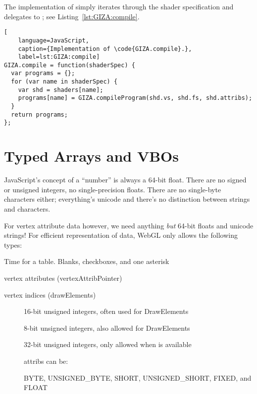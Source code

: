 The implementation of  simply iterates through the shader specification and delegates to ; see Listing~\ref{lst:GIZA:compile}.

\begin{lstlisting}[
    language=JavaScript,
    caption={Implementation of \code{GIZA.compile}.},
    label=lst:GIZA:compile]
GIZA.compile = function(shaderSpec) {
  var programs = {};
  for (var name in shaderSpec) {
    var shd = shaders[name];
    programs[name] = GIZA.compileProgram(shd.vs, shd.fs, shd.attribs);
  }
  return programs;
};
\end{lstlisting}

\section{Typed Arrays and VBOs}
\label{sec:VBOs}


JavaScript's concept of a ``number'' is always a 64-bit float.  There are no signed or unsigned integers, no single-precision floats.  There are no single-byte characters either; everything's unicode and there's no distinction between strings and characters.

For vertex attribute data however, we need anything \emph{but} 64-bit floats and unicode strings!  For efficient representation of data, WebGL only allows the following types:

Time for a table.  Blanks, checkboxes, and one asterisk

vertex attributes
(vertexAttribPointer)

vertex indices
(drawElements)

\begin{description}
\item[] 16-bit unsigned integers, often used for DrawElements
\item[] 8-bit unsigned integers, also allowed for DrawElements
\item[] 32-bit unsigned integers, only allowed when  is available

attribs can be:

BYTE, UNSIGNED_BYTE, SHORT, UNSIGNED_SHORT,
FIXED, and FLOAT

\end{description}

